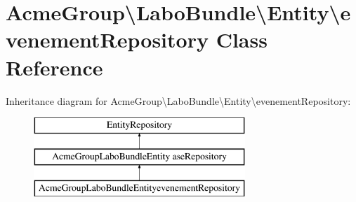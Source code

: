 \hypertarget{class_acme_group_1_1_labo_bundle_1_1_entity_1_1evenement_repository}{\section{Acme\+Group\textbackslash{}Labo\+Bundle\textbackslash{}Entity\textbackslash{}evenement\+Repository Class Reference}
\label{class_acme_group_1_1_labo_bundle_1_1_entity_1_1evenement_repository}
}
Inheritance diagram for Acme\+Group\textbackslash{}Labo\+Bundle\textbackslash{}Entity\textbackslash{}evenement\+Repository\+:\begin{figure}[H]
\begin{center}
\leavevmode
\includegraphics[height=3.000000cm]{class_acme_group_1_1_labo_bundle_1_1_entity_1_1evenement_repository}
\end{center}
\end{figure}
